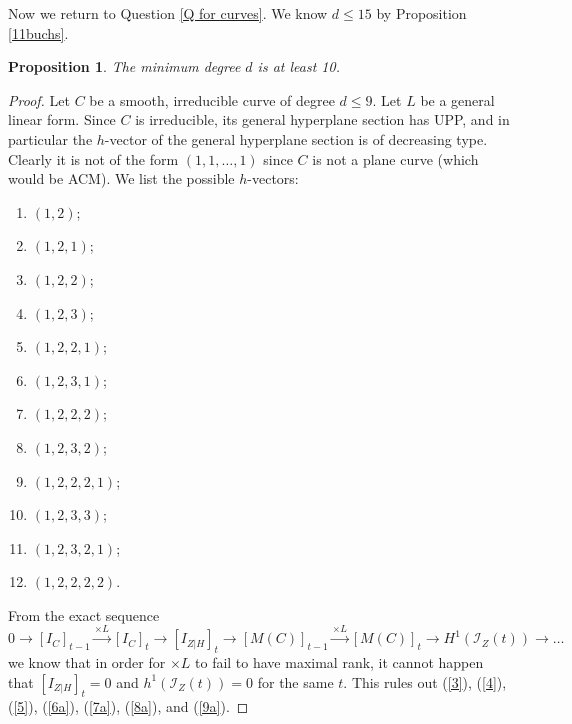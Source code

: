 \documentclass[12pt]{amsart}%
\numberwithin{equation}{section}
\newtheorem{proposition}[theorem]{Proposition}
\theoremstyle{definition}
\numberwithin{equation}{section}
\renewcommand{\labelenumi}{\arabic{enumi}.  }
\renewcommand{\labelenumii}{(\alph{enumii})}
\begin{document}
Now we return to Question \ref{Q for curves}. 
We know $d \leq 15$ by Proposition \ref{11buchs}. 

\begin{proposition} \label{at least 10}
        The minimum degree $d$ is at least 10.
\end{proposition}

\begin{proof}
    Let $C$ be a smooth, irreducible curve of degree $d \leq 9$. Let $L$ be a general linear form. Since $C$ is irreducible, its general hyperplane section has UPP, and in particular the $h$-vector of the general hyperplane section is of decreasing type. Clearly it is not of the form $(1,1,\dots,1)$ since $C$ is not a plane curve (which would be ACM). We list the possible $h$-vectors:

    \renewcommand{\labelenumi}{(\arabic{enumi})  }
\renewcommand{\labelenumii}{(\alph{enumii})}


    \begin{enumerate}
        \item \label{3} $(1,2)$;
        \item \label{4} $(1,2,1)$;
        \item \label{5} $(1,2,2)$;
        \item \label{6a} $(1,2,3)$;
        \item \label{6b} $(1,2,2,1)$;
        \item \label{7a} $(1,2,3,1)$;
        \item \label{7b} $(1,2,2,2)$;
        \item \label{8a} $(1,2,3,2)$;
        \item \label{8b} $(1,2,2,2,1)$;
        \item \label{9a} $(1,2,3,3)$;
        \item \label{9b} $(1,2,3,2,1)$;
        \item \label{9c} $(1,2,2,2,2)$.
    \end{enumerate}

    From the exact sequence 
    \begin{equation} \label{usual ses}
    0 \rightarrow [I_C]_{t-1} \stackrel{\times L}{\longrightarrow} [I_C]_t \rightarrow [I_{Z|H}]_t \rightarrow [M(C)]_{t-1} \stackrel{\times L}{\longrightarrow} [M(C)]_t \rightarrow H^1(\mathcal I_Z(t)) \rightarrow \dots
    \end{equation}
    we know that in order for $\times L$ to fail to have maximal rank, it cannot happen that $[I_{Z|H}]_t =0$ and $h^1(\mathcal I_Z(t)) =0$ for the same $t$. This rules out (\ref{3}), (\ref{4}), (\ref{5}), (\ref{6a}), (\ref{7a}), (\ref{8a}), and (\ref{9a}).


\end{proof}
\end{document}
